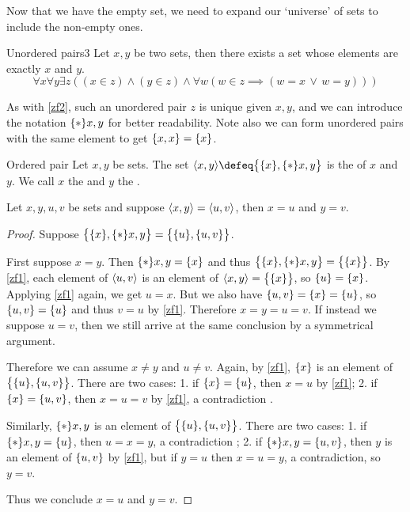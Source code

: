 \documentclass{styles/tufte}
\begin{document}
Now that we have the empty set, we need to expand our `universe' of sets to include the non-empty ones.

\begin{zf}{Unordered pairs}{3}
  Let $x, y$ be two sets, then there exists a set whose elements are exactly $x$ and $y$.
  \[ \forall x \forall y \exists z \left((x \in z) \land (y \in z) \land \forall w (w \in z \implies (w = x \,\lor\, w = y))\right) \]
\end{zf}

As with \cref{zf2}, such an unordered pair $z$ is unique given $x, y$, and we can introduce the notation $\set*{x, y}$ for better readability. Note also we can form unordered pairs with the same element to get $\set{x, x} = \set{x}$.

\begin{definition}{Ordered pair}{}
  Let $x, y$ be sets. The set $\opair{x, y} \defeq \set{\set{x}, \set*{x, y}}$ is the  of $x$ and $y$. We call $x$ the  and $y$ the .
\end{definition}

\begin{theorem}{}{}
  Let $x, y, u, v$ be sets and suppose $\langle x, y\rangle = \langle u, v\rangle$, then $x = u$ and $y = v$.
\end{theorem}
\begin{proof}
  Suppose $\set{\set{x}, \set*{x, y}} = \set{\set{u}, \set{u, v}}$.
  
  First suppose $x = y$. Then $\set*{x, y} = \set{x}$ and thus $\set{\set{x}, \set*{x, y}} = \set{\set{x}}$. By \cref{zf1}, each element of $\langle u, v\rangle$ is an element of $\opair{x, y} = \set{\set{x}}$, so $\set{u} = \set{x}$. Applying \cref{zf1} again, we get $u = x$. But we also have $\set{u, v} = \set{x} = \set{u}$, so $\set{u, v} = \set{u}$ and thus $v = u$ by \cref{zf1}. Therefore $x = y = u = v$. If instead we suppose $u = v$, then we still arrive at the same conclusion by a symmetrical argument.
  
  Therefore we can assume $x \neq y$ and $u \neq v$. Again, by \cref{zf1}, $\set{x}$ is an element of $\set{\set{u}, \set{u, v}}$. There are two cases: 1. if $\set{x} = \set{u}$, then $x = u$ by \cref{zf1}; 2. if $\set{x} = \set{u, v}$, then $x = u = v$ by \cref{zf1}, a contradiction \contradiction.
  
  Similarly, $\set*{x, y}$ is an element of $\set{\set{u}, \set{u, v}}$. There are two cases: 1. if $\set*{x, y} = \set{u}$, then $u = x = y$, a contradiction \contradiction; 2. if $\set*{x, y} = \set{u, v}$, then $y$ is an element of $\set{u, v}$ by \cref{zf1}, but if $y = u$ then $x = u = y$, a contradiction, so $y = v$.
  
  Thus we conclude $x = u$ and $y = v$.
\end{proof}
\end{document}
